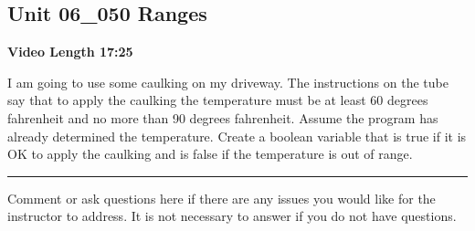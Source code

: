 \documentclass[letterpaper,12pt]{exam}
\newcommand{\unit}{Unit 06}
\begin{document}
\begin{questions}
\section*{\unit\_050 Ranges} %
\noindent \textbf{Video Length 17:25}

\begin{samepage}
    \question I am going to use some caulking on my driveway.  The instructions on the tube say that to apply the caulking the temperature must be at least 60 degrees fahrenheit and no more than 90 degrees fahrenheit.  Assume the program has already determined the temperature.  Create a boolean variable that is true if it is OK to apply the caulking and is false if the temperature is out of range.
    \vspace{5mm}
\end{samepage}

\begin{samepage}
    \begin{center}
    \rule{0.8\textwidth}{.4pt}
    \end{center}
	\question Comment or ask questions here if there are any issues you would like for the instructor to address.  It is not necessary to answer if you do not have questions.
	\vspace{30mm}
\end{samepage}

\end{questions}
\end{document}
